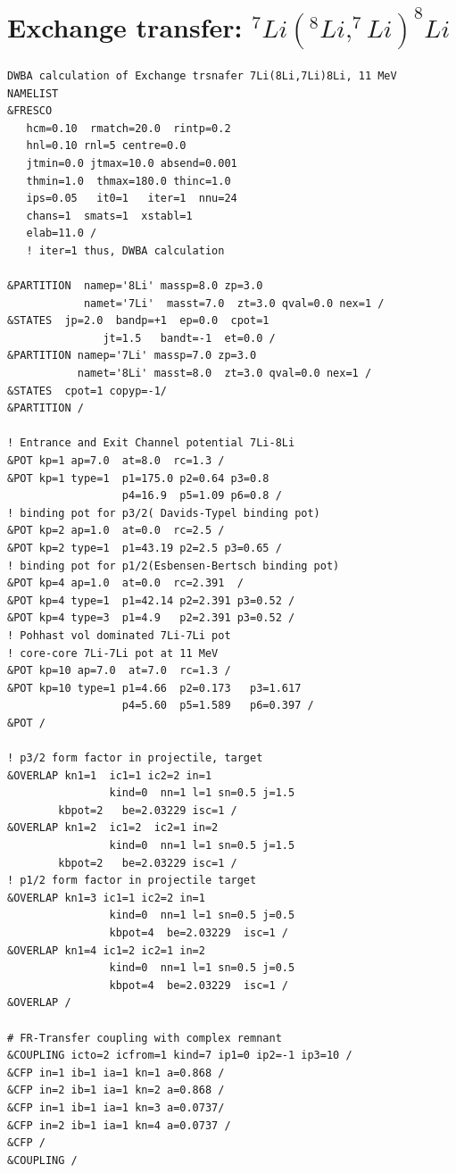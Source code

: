 \documentclass[11pt]{book}
\begin{document}
\section{Exchange transfer: $^7Li(^8Li,^7Li)^8Li$}
\begin{small} \begin{lstlisting}[frame=single]
DWBA calculation of Exchange trsnafer 7Li(8Li,7Li)8Li, 11 MeV
NAMELIST
&FRESCO
   hcm=0.10  rmatch=20.0  rintp=0.2  
   hnl=0.10 rnl=5 centre=0.0
   jtmin=0.0 jtmax=10.0 absend=0.001
   thmin=1.0  thmax=180.0 thinc=1.0
   ips=0.05   it0=1   iter=1  nnu=24
   chans=1  smats=1  xstabl=1
   elab=11.0 /
   ! iter=1 thus, DWBA calculation

&PARTITION  namep='8Li' massp=8.0 zp=3.0
            namet='7Li'  masst=7.0  zt=3.0 qval=0.0 nex=1 /
&STATES  jp=2.0  bandp=+1  ep=0.0  cpot=1
               jt=1.5   bandt=-1  et=0.0 /
&PARTITION namep='7Li' massp=7.0 zp=3.0
           namet='8Li' masst=8.0  zt=3.0 qval=0.0 nex=1 /
&STATES  cpot=1 copyp=-1/
&PARTITION /
				 
! Entrance and Exit Channel potential 7Li-8Li
&POT kp=1 ap=7.0  at=8.0  rc=1.3 / 
&POT kp=1 type=1  p1=175.0 p2=0.64 p3=0.8 
                  p4=16.9  p5=1.09 p6=0.8 /
! binding pot for p3/2( Davids-Typel binding pot)				
&POT kp=2 ap=1.0  at=0.0  rc=2.5 /
&POT kp=2 type=1  p1=43.19 p2=2.5 p3=0.65 /
! binding pot for p1/2(Esbensen-Bertsch binding pot)
&POT kp=4 ap=1.0  at=0.0  rc=2.391  /
&POT kp=4 type=1  p1=42.14 p2=2.391 p3=0.52 /
&POT kp=4 type=3  p1=4.9   p2=2.391 p3=0.52 / 
! Pohhast vol dominated 7Li-7Li pot
! core-core 7Li-7Li pot at 11 MeV
&POT kp=10 ap=7.0  at=7.0  rc=1.3 /
&POT kp=10 type=1 p1=4.66  p2=0.173   p3=1.617 
                  p4=5.60  p5=1.589   p6=0.397 /
&POT /
				
! p3/2 form factor in projectile, target				
&OVERLAP kn1=1  ic1=1 ic2=2 in=1 
                kind=0  nn=1 l=1 sn=0.5 j=1.5 
		kbpot=2   be=2.03229 isc=1 /
&OVERLAP kn1=2  ic1=2  ic2=1 in=2	
                kind=0  nn=1 l=1 sn=0.5 j=1.5 
		kbpot=2   be=2.03229 isc=1 /		
! p1/2 form factor in projectile target
&OVERLAP kn1=3 ic1=1 ic2=2 in=1
                kind=0  nn=1 l=1 sn=0.5	j=0.5 
                kbpot=4  be=2.03229  isc=1 /
&OVERLAP kn1=4 ic1=2 ic2=1 in=2
                kind=0  nn=1 l=1 sn=0.5	j=0.5 
                kbpot=4  be=2.03229  isc=1 /				
&OVERLAP /

# FR-Transfer coupling with complex remnant
&COUPLING icto=2 icfrom=1 kind=7 ip1=0 ip2=-1 ip3=10 /
&CFP in=1 ib=1 ia=1 kn=1 a=0.868 /
&CFP in=2 ib=1 ia=1 kn=2 a=0.868 /
&CFP in=1 ib=1 ia=1 kn=3 a=0.0737/
&CFP in=2 ib=1 ia=1 kn=4 a=0.0737 /
&CFP /
&COUPLING /
\end{lstlisting}\end{small}
\end{document}
